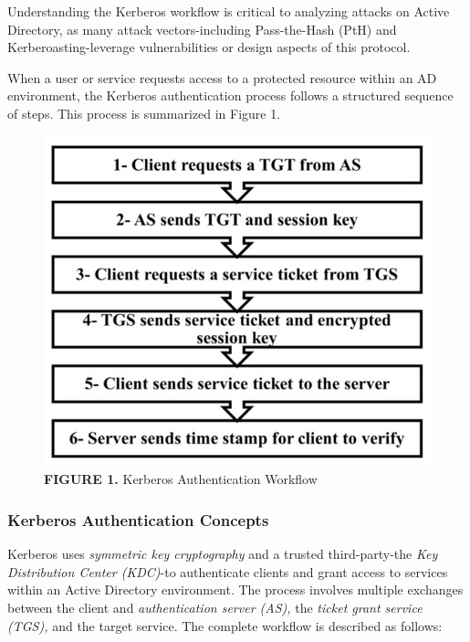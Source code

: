 {Understanding the Kerberos workflow is critical to analyzing attacks on Active Directory, as many attack vectors-including Pass-the-Hash (PtH) and Kerberoasting-leverage vulnerabilities or design aspects of this protocol.

When a user or service requests access to a protected resource within an AD environment, the Kerberos authentication process follows a structured sequence of steps. This process is summarized in Figure 1.

\begin{figure}
    \centering
    \includegraphics[width=1\linewidth]{tgtflow.png}
    \caption{\textbf{FIGURE 1. }Kerberos Authentication Workflow}
    \label{fig:placeholder}
\end{figure}

\subsubsection{Kerberos Authentication Concepts}
Kerberos uses \textit{symmetric key cryptography} and a trusted third-party-the \textit{Key Distribution Center (KDC)}-to authenticate clients and grant access to services within an Active Directory environment. The process involves multiple exchanges between the client and \textit{ authentication server (AS),} the \textit{ ticket grant service (TGS),} and the target service. The complete workflow is described as follows:

}
